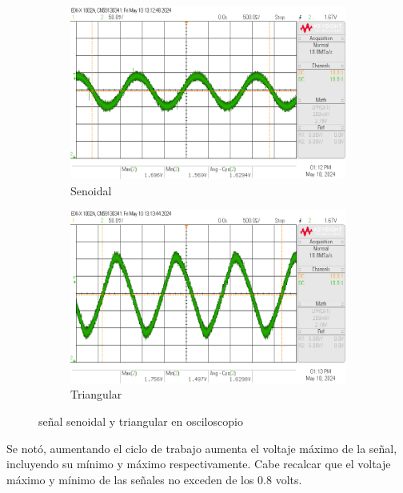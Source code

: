 \documentclass{article}
\begin{document}
\begin{figure}[H]
    \centering
    \begin{subfigure}{.5\textwidth}
        \centering
        \includegraphics[width=\linewidth]{images/senoidal.png}
        \caption{Senoidal}
        \label{fig:senoidal}
    \end{subfigure}%
    \hfill
    \begin{subfigure}{.5\textwidth}
        \centering
        \includegraphics[width=\linewidth]{images/triangular.png}
        \caption{Triangular}
        \label{fig:triangular}
    \end{subfigure}
    \caption{señal senoidal y triangular en osciloscopio}
    \label{fig:señales}
\end{figure}

Se notó, aumentando el ciclo de trabajo aumenta el voltaje máximo de la señal, incluyendo su mínimo y máximo respectivamente.
Cabe recalcar que el voltaje máximo y mínimo de las señales no exceden de los 0.8 volts. 
\end{document}
